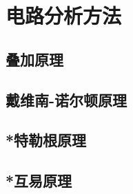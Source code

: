 

\section{电路分析方法}\label{17-4}

\subsection{叠加原理}\label{17-4-1}

\subsection{戴维南-诺尔顿原理}\label{17-4-2}

\subsection{*特勒根原理}\label{17-4-3}

\subsection{*互易原理}\label{17-4-4}